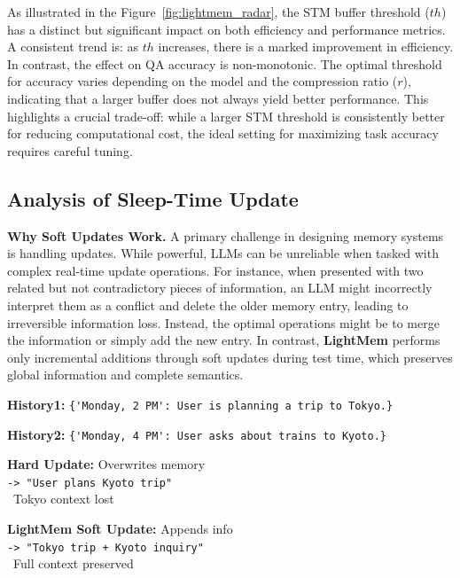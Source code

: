 As illustrated in the Figure~\ref{fig:lightmem_radar}, the STM buffer threshold ($th$) has a distinct but significant impact on both efficiency and performance metrics.
A consistent trend is: as $th$ increases, there is a marked improvement in efficiency.
In contrast, the effect on QA accuracy is non-monotonic. 
The optimal threshold for accuracy varies depending on the model and the compression ratio ($r$), indicating that a larger buffer does not always yield better performance. 
This highlights a crucial trade-off: 
while a larger STM threshold is consistently better for reducing computational cost, the ideal setting for maximizing task accuracy requires careful tuning.

\subsection{Analysis of Sleep-Time Update}
\label{sec:case_study}
\noindent \textbf{Why Soft Updates Work.}
A primary challenge in designing memory systems is handling updates. 
While powerful, LLMs can be unreliable when tasked with complex real-time update operations. 
For instance, when presented with two related but not contradictory pieces of information, an LLM might incorrectly interpret them as a conflict and delete the older memory entry, leading to irreversible information loss. 
Instead, the optimal operations might be to merge the information or simply add the new entry. 
In contrast, \textbf{LightMem} performs only incremental additions through soft updates during test time, which preserves global information and complete semantics.
\begin{tcolorbox}[
    title=\textbf{Case Study: Memory Update Mechanism Comparison},
    colback=gray!5,
    colframe=black!60,
    fonttitle=\bfseries,
]
\small
\textbf{History1:} \verb|{'Monday, 2 PM': User is planning a trip to Tokyo.}|

\textbf{History2:} \verb|{'Monday, 4 PM': User asks about trains to Kyoto.}|

\noindent
\begin{minipage}[t]{0.49\linewidth}
    \textcolor{red!70!black}{\textbf{Hard Update:}} Overwrites memory
    \\ \texttt{-> "User plans Kyoto trip"}
    \\ \textcolor{red!60}{\faExclamationTriangle\, Tokyo context lost}
\end{minipage}
\hfill
\begin{minipage}[t]{0.49\linewidth}
    \textcolor{green!60!black}{\textbf{LightMem Soft Update:}} Appends info
    \\ \texttt{-> "Tokyo trip + Kyoto inquiry"}  
    \\ \textcolor{green!60}{\faCheckCircle\, Full context preserved}
\end{minipage}
\end{tcolorbox}

